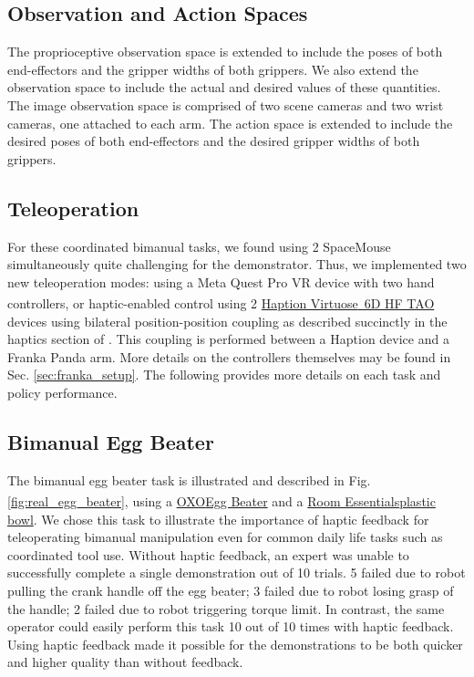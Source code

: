 \documentclass[Afour,sageh,times]{sagej}
\newcommand{\legalTM}{\textsuperscript{\texttrademark}}
\begin{document}
\subsection{Observation and Action Spaces}
The proprioceptive observation space is extended to include the poses of both end-effectors and the gripper widths of both grippers. We also extend the observation space to include the actual and desired values of these quantities.
The image observation space is comprised of two scene cameras and two wrist cameras, one attached to each arm.
The action space is extended to include the desired poses of both end-effectors and the desired gripper widths of both grippers.

\subsection{Teleoperation}
For these coordinated bimanual tasks, we found using 2 SpaceMouse simultaneously quite challenging for the demonstrator. Thus, we implemented two new teleoperation modes:
using a Meta Quest Pro VR device with two hand controllers, or
haptic-enabled control using 2
\href{https://www.haption.com/en/products-en/virtuose-6d-tao-en.html\#fa-download-downloads}{
Haption Virtuose\legalTM\ 6D HF TAO}
devices using bilateral position-position coupling as described succinctly in the haptics section of \citet{siciliano2008springer}. This coupling is performed between a Haption device and a Franka Panda arm.
More details on the controllers themselves may be found in Sec. \ref{sec:franka_setup}.
The following provides more details on each task and policy performance.

\subsection{Bimanual Egg Beater}

The bimanual egg beater task is illustrated and described in Fig. \ref{fig:real_egg_beater}, using a
\href{https://www.oxo.com/egg-beater.html}{OXO\legalTM Egg Beater} and a
\href{https://www.target.com/p/114oz-plastic-serving-bowl-jet-gray-room-essentials-8482/-/A-86701588}{Room Essentials\legalTM plastic bowl}. We chose this task to illustrate the importance of haptic feedback for teleoperating bimanual manipulation even for common daily life tasks such as coordinated tool use. Without haptic feedback, an expert was unable to successfully complete a single demonstration out of 10 trials. 5 failed due to robot pulling the crank handle off the egg beater; 3 failed due to robot losing grasp of the handle; 2 failed due to robot triggering torque limit. In contrast, the same operator could easily perform this task 10 out of 10 times with haptic feedback. Using haptic feedback made it possible for the demonstrations to be both quicker and higher quality than without feedback.
\end{document}
